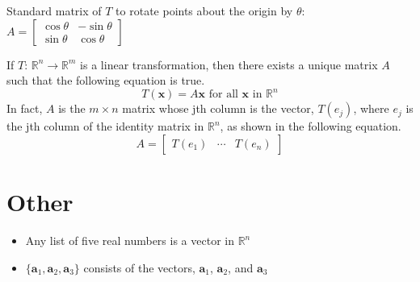 \documentclass{article}
\begin{document}
Standard matrix of $T$ to rotate points about the origin by $\theta$:
$A=\begin{bmatrix}
    \cos\theta & -\sin\theta \\
    \sin\theta & \cos\theta
\end{bmatrix}$

If $T$: $\mathbb{R}^n\rightarrow\mathbb{R}^m$ is a linear transformation, then there exists a
unique matrix $A$ such that the following equation is true.
\[T(\mathbf{x})=A\mathbf{x}\text{ for all }\mathbf{x}\text{ in }\mathbb{R}^n\]
In fact, $A$ is the $m\times n$ matrix whose jth column is the vector, $T(e_j)$, where $e_j$ is the
jth column of the identity matrix in $\mathbb{R}^n$, as shown in the following equation.
\[A=\begin{bmatrix}
    T(e_1) & \cdots & T(e_n) 
\end{bmatrix}\]

\section*{Other}
\begin{itemize}
    \item Any list of five real numbers is a vector in $\mathbb{R}^n$
    \item $\{\mathbf{a}_1, \mathbf{a}_2, \mathbf{a}_3\}$ consists of the vectors, $\mathbf{a}_1$,
    $\mathbf{a}_2$, and $\mathbf{a}_3$
\end{itemize}
\end{document}
